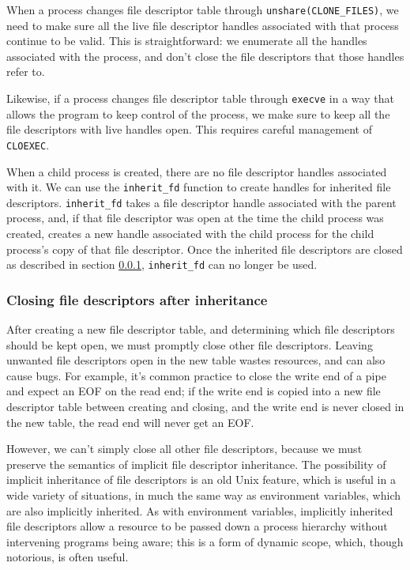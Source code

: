 \documentclass[letterpaper,twocolumn,10pt]{article}
\begin{document}
When a process changes file descriptor table through \verb|unshare(CLONE_FILES)|,
we need to make sure all the live file descriptor handles associated with that process continue to be valid.
This is straightforward:
we enumerate all the handles associated with the process,
and don't close the file descriptors that those handles refer to.

Likewise, if a process changes file descriptor table through \texttt{execve}
in a way that allows the program to keep control of the process,
we make sure to keep all the file descriptors with live handles open.
This requires careful management of \texttt{CLOEXEC}.

When a child process is created,
there are no file descriptor handles associated with it.
We can use the \verb|inherit_fd| function to create handles for inherited file descriptors.
\verb|inherit_fd| takes a file descriptor handle associated with the parent process,
and, if that file descriptor was open at the time the child process was created,
creates a new handle associated with the child process
for the child process's copy of that file descriptor.
Once the inherited file descriptors are closed as described in section \ref{cloexec},
\verb|inherit_fd| can no longer be used.
\subsubsection{Closing file descriptors after inheritance}\label{cloexec}
After creating a new file descriptor table,
and determining which file descriptors should be kept open,
we must promptly close other file descriptors.
Leaving unwanted file descriptors open in the new table wastes resources,
and can also cause bugs.
For example, it's common practice to close the write end of a pipe
and expect an EOF on the read end;
if the write end is copied into a new file descriptor table between creating and closing,
and the write end is never closed in the new table,
the read end will never get an EOF.

However, we can't simply close all other file descriptors,
because we must preserve the semantics of implicit file descriptor inheritance.
The possibility of implicit inheritance of file descriptors is an old Unix feature,
which is useful in a wide variety of situations,
in much the same way as environment variables, which are also implicitly inherited.
As with environment variables,
implicitly inherited file descriptors allow a resource to be passed down a process hierarchy
without intervening programs being aware;
this is a form of dynamic scope, which, though notorious, is often useful.
\end{document}
